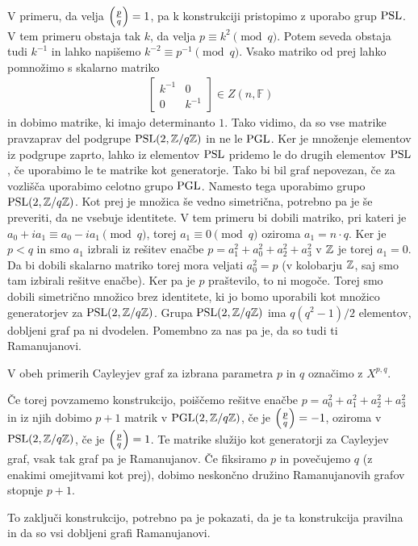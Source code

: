 V primeru, da velja \(\left(\frac{p}{q}\right) = 1\), pa k konstrukciji pristopimo z uporabo grup \(\operatorname{PSL}\). V tem primeru obstaja tak \(k\), da velja \(p\equiv k^2 \pmod q\). Potem seveda obstaja tudi \(k^{-1}\) in lahko napišemo \(k^{-2} \equiv p^{-1}\pmod q\). Vsako matriko od prej lahko pomnožimo s skalarno matriko
\begin{align*}
    \begin{bmatrix}
        k^{-1} & 0 \\
        0 & k^{-1}
    \end{bmatrix}\in Z(n, \mathbb F)
\end{align*}
in dobimo matrike, ki imajo determinanto \(1\). Tako vidimo, da so vse matrike pravzaprav del podgrupe \(\operatorname{PSL}(2, \mathbb Z/q\mathbb Z)\) in ne le \(\operatorname{PGL}\). Ker je množenje elementov iz podgrupe zaprto, lahko iz elementov \(\operatorname{PSL}\) pridemo le do drugih elementov \(\operatorname{PSL}\), če uporabimo le te matrike kot generatorje. Tako bi bil graf nepovezan, če za vozlišča uporabimo celotno grupo \(\operatorname{PGL}\). Namesto tega uporabimo grupo \(\operatorname{PSL}(2, \mathbb Z/q\mathbb Z)\). Kot prej je množica še vedno simetrična, potrebno pa je še preveriti, da ne vsebuje identitete. V tem primeru bi dobili matriko, pri kateri je \(a_0 +ia_1 \equiv a_0 - ia_1 \pmod q\), torej \(a_1 \equiv 0 \pmod q\) oziroma \(a_1 = n\cdot q\). Ker je \(p<q\) in smo \(a_1\) izbrali iz rešitev enačbe \(p=a_1^2 + a_0^2 + a_2^2 + a_3^2\) v \(\mathbb Z\) je torej \(a_1=0\). Da bi dobili skalarno matriko torej mora veljati \(a_0^2 = p\) (v kolobarju \(\mathbb Z\), saj smo tam izbirali rešitve enačbe). Ker pa je \(p\) praštevilo, to ni mogoče. Torej smo dobili simetrično množico brez identitete, ki jo bomo uporabili kot množico generatorjev za \(\operatorname{PSL}(2, \mathbb Z/q\mathbb Z)\). Grupa \(\operatorname{PSL}(2, \mathbb Z/q\mathbb Z)\) ima \(q(q^2-1)/2\) elementov, dobljeni graf pa ni dvodelen. Pomembno za nas pa je, da so tudi ti Ramanujanovi. 

V obeh primerih Cayleyjev graf za izbrana parametra \(p\) in \(q\) označimo z \(X^{p,q}\).

Če torej povzamemo konstrukcijo, poiščemo rešitve enačbe \(p = a_0^2 + a_1^2 + a_2^2 + a_3^2\) in iz njih dobimo \(p+1\) matrik v \(\operatorname{PGL}(2, \mathbb Z/q\mathbb Z)\), če je \(\left(\frac{p}{q}\right)=-1\), oziroma v \(\operatorname{PSL}(2, \mathbb Z/q\mathbb Z)\), če je \(\left(\frac{p}{q}\right)=1\). Te matrike služijo kot generatorji za Cayleyjev graf, vsak tak graf pa je Ramanujanov. Če fiksiramo \(p\) in povečujemo \(q\) (z enakimi omejitvami kot prej), dobimo neskončno družino Ramanujanovih grafov stopnje \(p+1\).

To zaključi konstrukcijo, potrebno pa je pokazati, da je ta konstrukcija pravilna in da so vsi dobljeni grafi Ramanujanovi.

